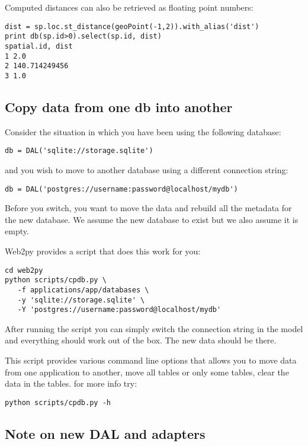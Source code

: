 \documentclass[justified,sixbynine,notoc]{tufte-book}
\begin{document}
\begin{fullwidth}
Computed distances can also be retrieved as floating point numbers:

\begin{lstlisting}
dist = sp.loc.st_distance(geoPoint(-1,2)).with_alias('dist')
print db(sp.id>0).select(sp.id, dist)
spatial.id, dist
1 2.0
2 140.714249456
3 1.0
\end{lstlisting}

\goodbreak\subsection{Copy data from one db into another}

Consider the situation in which you have been using the following database:

\begin{lstlisting}
db = DAL('sqlite://storage.sqlite')
\end{lstlisting}
\noindent and you wish to move to another database using a different connection string:

\begin{lstlisting}
db = DAL('postgres://username:password@localhost/mydb')
\end{lstlisting}

Before you switch, you want to move the data and rebuild all the metadata for the new database. We assume the new database to exist but we also assume it is empty.

Web2py provides a script that does this work for you:

\begin{lstlisting}
cd web2py
python scripts/cpdb.py \
   -f applications/app/databases \
   -y 'sqlite://storage.sqlite' \
   -Y 'postgres://username:password@localhost/mydb'
\end{lstlisting}

After running the script you can simply switch the connection string in the model and everything should work out of the box. The new data should be there.

This script provides various command line options that allows you to move data from one application to another, move all tables or only some tables, clear the data in the tables. for more info try:

\begin{lstlisting}
python scripts/cpdb.py -h
\end{lstlisting}

\goodbreak\subsection{Note on new DAL and adapters}


\end{fullwidth}
\end{document}
